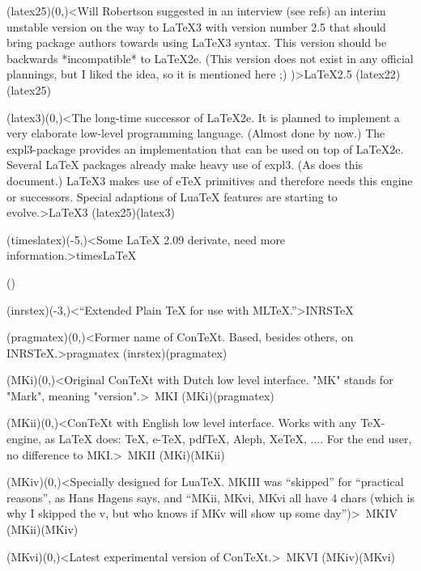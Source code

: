 {	\tonode[\planned](latex25)(0,\layer)<Will Robertson suggested in an interview (see refs) an interim unstable version on the way to LaTeX3 with version number 2.5 that should bring package authors towards using LaTeX3 syntax. This version should be backwards *incompatible* to LaTeX2e. (This version does not exist in any official plannings, but I liked the idea, so it is mentioned here ;) )>{\LaTeX2.5}
	\todraw(latex22)(latex25)
	
	\steplayer[-3]
	\tonode[\planned](latex3)(0,\layer)<The long-time successor of LaTeX2e. It is planned to implement a very elaborate low-level programming language. (Almost done by now.) The expl3-package provides an implementation that can be used on top of LaTeX2e. Several LaTeX packages already make heavy use of expl3. (As does this document.) LaTeX3 makes use of eTeX primitives and therefore needs this engine or successors. Special adaptions of LuaTeX features are starting to evolve.>{\LaTeX{}3}
	\todraw(latex25)(latex3)

	\steplayer[-3]
	\tonode[\experimental](timeslatex)(-5,\layer)<Some LaTeX 2.09 derivate, need more information.>{times\LaTeX}
}

\clearpage
\tograph*(){
	\tonode(inrstex)(-3,\layer)<“Extended Plain TeX for use with MLTeX.”>{INRS\TeX}
	\steplayer[-2]

	\tonode(pragmatex)(0,\layer)<Former name of ConTeXt. Based, besides others, on INRSTeX.>{pragmatex}
	\todraw(inrstex)(pragmatex)
	\steplayer[-2]

	\tonode(MKi)(0,\layer)<Original ConTeXt with Dutch low level interface. "MK" stands for "Mark", meaning "version".>{\ConTeXt\ MKI}
	\todraw(MKi)(pragmatex)
	\steplayer[-2]

	\tonode[\vip](MKii)(0,\layer)<ConTeXt with English low level interface. Works with any TeX-engine, as LaTeX does: TeX, e-TeX, pdfTeX, Aleph, XeTeX, .... For the end user, no difference to MKI.>{\ConTeXt\ MKII}
	\todraw(MKi)(MKii)
	\steplayer[-2]
	
	\tonode[\vip](MKiv)(0,\layer)<Specially designed for LuaTeX. MKIII was “skipped” for “practical reasons”, as Hans Hagens says, and “MKii, MKvi, MKvi all have 4 chars (which is why I skipped the v, but who knows if MKv will show up some day”)>{\ConTeXt\ MKIV}
	\todraw*(MKii)(MKiv)
	\steplayer[-2]

	\tonode[\experimental](MKvi)(0,\layer)<Latest experimental version of ConTeXt.>{\ConTeXt\ MKVI}
	\todraw(MKiv)(MKvi)
}

